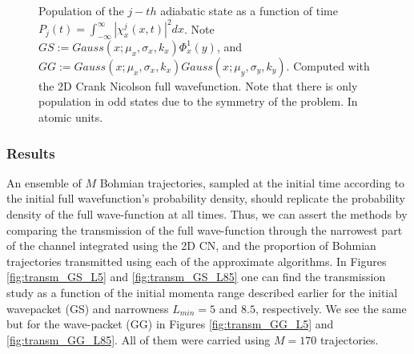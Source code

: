 \documentclass[11pt, a4paper]{article} %
\begin{document}
\begin{figure}[p]
  \caption{ Population of the $j-th$ adiabatic state as a function of time $P_j(t)=\int_{-\infty}^\infty |\chi^j_x(x,t)|^2dx $. Note $GS:=Gauss(x;\mu_x, \sigma_x, k_x)\Phi^1_x(y)$, and $GG:=Gauss(x;\mu_x, \sigma_x, k_x)Gauss(x;\mu_y, \sigma_y, k_y)$. Computed with the 2D Crank Nicolson full wavefunction. Note that there is only population in odd states due to the symmetry of the problem. In atomic units.}
  \label{fig:popsInTime}
\end{figure}
\newpage


\subsubsection{Results}\vspace{-0.3cm}
An ensemble of $M$ Bohmian trajectories, sampled at the initial time according to the initial full wavefunction's probability density, should replicate the probability density of the full wave-function at all times. Thus, we can assert the methods by comparing the transmission of the full wave-function through the narrowest part of the channel integrated using the 2D CN, and the proportion of Bohmian trajectories transmitted using each of the approximate algorithms. In Figures \ref{fig:transm_GS_L5} and \ref{fig:transm_GS_L85} one can find the transmission study as a function of the initial momenta range described earlier for the initial wavepacket (GS) and narrowness $L_{min}=5$ and $8.5$, respectively. We see the same but for the wave-packet (GG) in Figures \ref{fig:transm_GG_L5} and \ref{fig:transm_GG_L85}. All of them were carried using $M=170$ trajectories.
\end{document}
